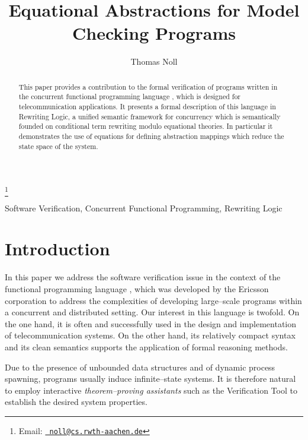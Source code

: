 \documentclass{entcs}
\begin{document}
 
\begin{frontmatter}
  \title{Equational Abstractions for Model Checking \Erlang Programs}
  \author{Thomas Noll}
  \address{Lehrstuhl f\"ur Informatik II\\ Aachen University\\
    52056 Aachen, Germany}
  \thanks[myemail]{Email:
    \href{mailto:noll@cs.rwth-aachen.de} {\texttt{\normalshape
        noll@cs.rwth-aachen.de}}}
\begin{abstract}
  This paper provides a contribution to the formal verification of
  programs written in the concurrent functional programming language
  \Erlang, which is designed for telecommunication applications. It
  presents a formal description of this language in Rewriting Logic,
  a unified semantic framework for concurrency which is semantically
  founded on conditional term rewriting modulo equational theories.
  In particular it demonstrates the use of equations for defining
  abstraction mappings which reduce the state space of the system.
\end{abstract}
\begin{keyword}
  Software Verification, Concurrent Functional Programming,
  Rewriting Logic
\end{keyword}
\end{frontmatter}



\section{Introduction}
\label{SctIntro}

In this paper we address the software verification issue in the context of the
functional
programming language \Erlang \cite{AVWW96}, which was developed by the
Ericsson corporation to address the complexities of developing
large--scale programs within a concurrent and distributed setting.
Our interest in this language is twofold. On the one hand, it is often and
successfully used in the design and implementation of
telecommunication systems. On the other hand, its relatively compact syntax and its clean semantics supports the application of formal reasoning methods.

Due to the presence of unbounded data
structures and of dynamic process spawning, \Erlang programs usually
induce infinite--state systems. It is therefore natural to employ
interactive \emph{theorem--proving assistants} such as the \EVT \Erlang
Verification Tool \cite{FGN01,FGN02} to establish the desired system
properties.
\end{document}
